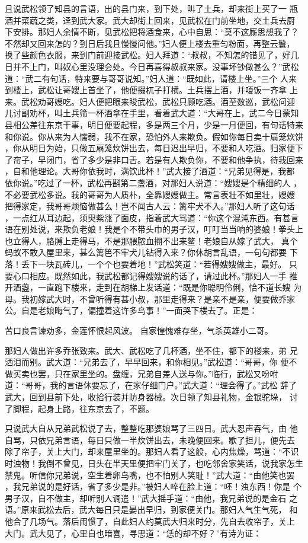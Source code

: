 且说武松领了知县的言语，出的县门来，到下处，叫了土兵，却来街上买了一
瓶酒并菜蔬之类，迳到武大家。武大却街上回来，见武松在门前坐地，交土兵去厨
下安排。那妇人余情不断，见武松把将酒食来，心中自思：“莫不这厮思想我了？
不然却又回来怎的？到日后我且慢慢问他。”妇人便上楼去重匀粉面，再整云鬟，
换了些颜色衣服，来到门前迎接武松。妇人拜道：“叔叔，不知怎的错见了，好几
日并不上门，叫奴心里没理会处。今日再喜得叔叔来家。没事坏钞做甚么？”武松
道：“武二有句话，特来要与哥哥说知。”妇人道：“既如此，请楼上坐。”三个
人来到楼上，武松让哥嫂上首坐了，他便掇杌子打横。土兵摆上酒，并嗄饭一齐拿
上来。武松劝哥嫂吃。妇人便把眼来睃武松，武松只顾吃酒。酒至数巡，武松问迎
儿讨副劝杯，叫土兵筛一杯酒拿在手里，看着武大道：“大哥在上，武二今日蒙知
县相公差往东京干事，明日便要起程，多是两三个月，少是一月便回，有句话特来
和你说。你从来为人懦弱，我不在家，恐怕外人来欺负。假如你每日卖十扇笼炊饼
，你从明日为始，只做五扇笼炊饼出去，每日迟出早归，不要和人吃酒。归家便下
了帘子，早闭门，省了多少是非口舌。若是有人欺负你，不要和他争执，待我回来
，自和他理论。大哥你依我时，满饮此杯！”武大接了酒道：“兄弟见得是，我都
依你说。”吃过了一杯，武松再斟第二盏酒，对那妇人说道：“嫂嫂是个精细的人
，不必要武松多说。我的哥哥为人质朴，全靠嫂嫂做主。常言表壮不如里壮，嫂嫂
把得家定，我哥哥烦恼做甚么！岂不闻古人云：篱牢犬不入。”那妇人听了这句话
，一点红从耳边起，须臾紫涨了面皮，指着武大骂道：“你这个混沌东西。有甚言
语在别处说，来欺负老娘！我是个不带头巾的男子汉，叮叮当当响的婆娘！拳头上
也立得人，胳膊上走得马，不是那腲脓血搠不出来鳖！老娘自从嫁了武大，
真个蚂蚁不敢入屋里来，甚么篱笆不牢犬儿钻得入来？你休胡言乱语，一句句都要
下落！丢下一块瓦砖儿，一个个也要着地！”武松笑道：“若得嫂嫂做主，最好。
只要心口相应。既然如此，我武松都记得嫂嫂说的话了，请过此杯。”那妇人一手
推开酒盏，一直跑下楼来，走到在胡梯上发话道：“既是你聪明伶俐，恰不道长嫂
为母。我初嫁武大时，不曾听得有甚小叔，那里走得来？是亲不是亲，便要做乔家
公。自是老娘晦气了，偏撞着这许多鸟事！”一面哭下楼去了。正是：

苦口良言谏劝多，金莲怀恨起风波。
自家惶愧难存坐，气杀英雄小二哥。

那妇人做出许多乔张致来。武大、武松吃了几杯酒，坐不住，都下的楼来，弟
兄洒泪而别。武大道：“兄弟去了，早早回来，和你相见。”武松道：“哥哥，你
便不做买卖也罢，只在家里坐的。盘缠，兄弟自差人送与你。”临行，武松又吩咐
道：“哥哥，我的言语休要忘了，在家仔细门户。”武大道：“理会得了。”武松
辞了武大，回到县前下处，收拾行装并防身器械。次日领了知县礼物，金银驼垛，
讨了脚程，起身上路，往东京去了，不题。

只说武大自从兄弟武松说了去，整整吃那婆娘骂了三四日。武大忍声吞气，由
他自骂，只依兄弟言语，每日只做一半炊饼出去，未晚便回来。歇了担儿，便先去
除了帘子，关上大门，却来屋里坐的。那妇人看了这般，心内焦燥，骂道：“不识
时浊物！我倒不曾见，日头在半天里便把牢门关了，也吃邻舍家笑话，说我家怎生
禁鬼。听信你兄弟说，空生着卵鸟嘴，也不怕别人笑耻！”武大道：“由他笑也罢
，我兄弟说的是好话，省了多少是非。”被妇人啐在脸上道：“呸！浊东西！你是
个男子汉，自不做主，却听别人调遣！”武大摇手道：“由他，我兄弟说的是金石
之语。”原来武松去后，武大每日只是晏出早归，到家便关门。那妇人气生气死，
和他合了几场气。落后闹惯了，自此妇人约莫武大归来时分，先自去收帘子，关上
大门。武大见了，心里自也暗喜，寻思道：“恁的却不好？”有诗为证：

